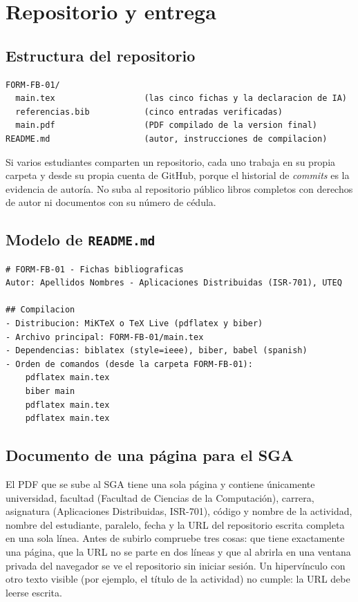 \documentclass[11pt,a4paper]{article}
\begin{document}
\section{Repositorio y entrega}

\subsection{Estructura del repositorio}

\begin{lstlisting}
FORM-FB-01/
  main.tex                  (las cinco fichas y la declaracion de IA)
  referencias.bib           (cinco entradas verificadas)
  main.pdf                  (PDF compilado de la version final)
README.md                   (autor, instrucciones de compilacion)
\end{lstlisting}

Si varios estudiantes comparten un repositorio, cada uno trabaja en su propia carpeta y desde su propia cuenta de GitHub, porque el historial de \emph{commits} es la evidencia de autoría. No suba al repositorio público libros completos con derechos de autor ni documentos con su número de cédula.

\subsection{Modelo de \texttt{README.md}}

\begin{lstlisting}
# FORM-FB-01 - Fichas bibliograficas
Autor: Apellidos Nombres - Aplicaciones Distribuidas (ISR-701), UTEQ

## Compilacion
- Distribucion: MiKTeX o TeX Live (pdflatex y biber)
- Archivo principal: FORM-FB-01/main.tex
- Dependencias: biblatex (style=ieee), biber, babel (spanish)
- Orden de comandos (desde la carpeta FORM-FB-01):
    pdflatex main.tex
    biber main
    pdflatex main.tex
    pdflatex main.tex
\end{lstlisting}

\subsection{Documento de una página para el SGA}

El PDF que se sube al SGA tiene una sola página y contiene únicamente universidad, facultad (Facultad de Ciencias de la Computación), carrera, asignatura (Aplicaciones Distribuidas, ISR-701), código y nombre de la actividad, nombre del estudiante, paralelo, fecha y la URL del repositorio escrita completa en una sola línea. Antes de subirlo compruebe tres cosas: que tiene exactamente una página, que la URL no se parte en dos líneas y que al abrirla en una ventana privada del navegador se ve el repositorio sin iniciar sesión. Un hipervínculo con otro texto visible (por ejemplo, el título de la actividad) no cumple: la URL debe leerse escrita.
\end{document}
